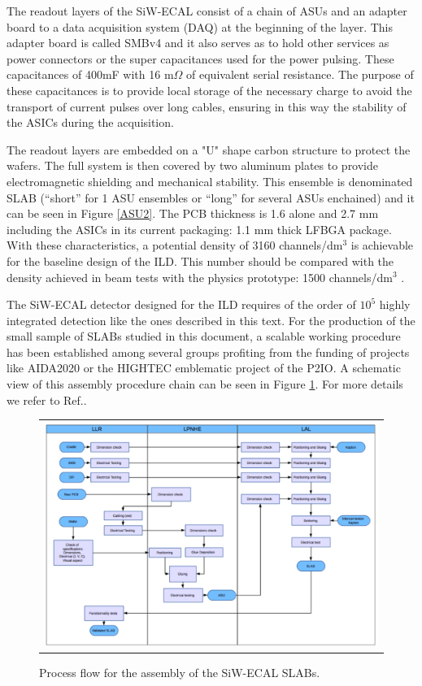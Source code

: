 \documentclass[a4paper,11pt]{article}
\begin{document}
The readout layers of the SiW-ECAL consist of a chain of ASUs and an adapter board
to a data acquisition system (DAQ) at the beginning of the layer.
This adapter board is called SMBv4
and it also serves as to hold other services as power connectors or the super capacitances used for the power pulsing. 
These capacitances of 400mF with 16 m$\Omega$ of equivalent serial resistance. 
The purpose of these capacitances is to provide local storage 
of the necessary charge to avoid the transport of current pulses over long cables, 
ensuring in this way the stability of the ASICs during the acquisition.

The readout layers are embedded on a "U" shape carbon structure to protect the wafers.
The full system is then covered by two aluminum plates
to provide electromagnetic shielding and mechanical stability.
This ensemble is denominated SLAB
(``short'' for 1 ASU ensembles or ``long'' for several ASUs enchained) and it can be seen in
Figure \ref{ASU2}.
The PCB thickness is 1.6 alone and 2.7 mm
including the ASICs in its current packaging: 1.1 mm thick LFBGA package.
With these characteristics, a potential density of
3160 channels/dm$^{3}$ is achievable for the baseline design 
of the ILD. This number should be compared with
the density achieved in beam tests with the physics prototype: 1500 channels/dm$^{3}$ \cite{Amjad:2014tha}.

The SiW-ECAL detector designed for the ILD requires of the order
of $10^{5}$ highly integrated detection like the ones described in this text.
For the production of the small sample of SLABs studied in this document,
a scalable working procedure has been established among several groups \cite{Boudry:2318814}
profiting from the funding of projects like AIDA2020 or the HIGHTEC emblematic project
of the P2IO. A schematic view of this assembly procedure chain can be seen in
Figure \ref{assembly}. For more details we refer to Ref.\cite{Boudry:2318814}.

\begin{figure}[!t]
\centering
\begin{tabular}{l}
\includegraphics[width=6.0in]{../figs/assembly.png} 
\end{tabular}
\caption{Process flow for the assembly of the SiW-ECAL SLABs.}
\label{assembly}
\end{figure}
\end{document}
